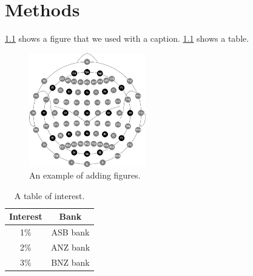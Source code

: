 \chapter{Methods} \label{chap:methods}

\cref{fig:1020EEG} shows a figure that we used with a caption. \cref{tab:interest} shows a table.


\begin{figure}[!htb]
	\centering
	\includegraphics[width=2in]{figures/EEG_final_1020.pdf}
	\caption{An example of adding figures.}
	\label{fig:1020EEG}
\end{figure}

\begin{table}[!htb]
	\caption{A table of interest.}
	\label{tab:interest}
	\centering
	\begin{tabular}{cc}
		\toprule
		\textbf{Interest} & \textbf{Bank} \\
		\midrule
		1\% 	&	ASB bank \\
		2\% 	& 	ANZ bank \\
		3\%		& 	BNZ bank \\
		\bottomrule
	\end{tabular}
\end{table}